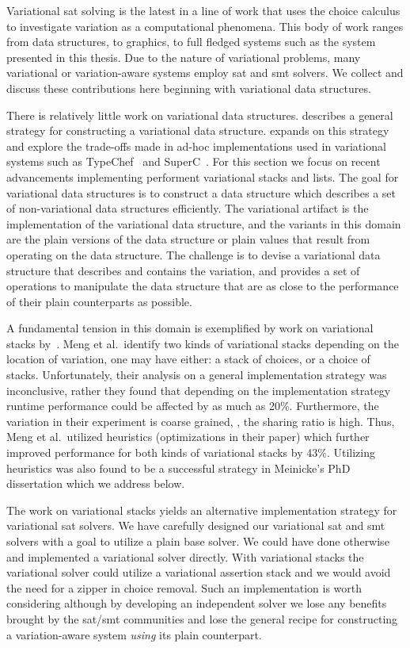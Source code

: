\label{section:related-work:variational-systems}
%
Variational \ac{sat} solving is the latest in a line of work that uses the
choice calculus to investigate variation as a computational phenomena. This body
of work ranges from data structures, to graphics, to full fledged systems such
as the system presented in this thesis. Due to the nature of variational
problems, many variational or variation-aware systems employ \ac{sat} and
\ac{smt} solvers. We collect and discuss these contributions here beginning with
variational data structures.

There is relatively little work on variational data structures.
\citet{EWC13fosd} describes a general strategy for constructing a variational
data structure. \citet{Walk14onward} expands on this strategy and explore the
trade-offs made in ad-hoc implementations used in variational systems such as
TypeChef~\cite{KKHL:FOSD10} and SuperC~\cite{GG:PLDI12}. For this section we
focus on recent advancements implementing performent variational stacks and
lists. The goal for variational data structures is to construct a data structure
which describes a set of non-variational data structures efficiently. The
variational artifact is the implementation of the variational data structure,
and the variants in this domain are the plain versions of the data structure or
plain values that result from operating on the data structure. The challenge is
to devise a variational data structure that describes and contains the
variation, and provides a set of operations to manipulate the data structure
that are as close to the performance of their plain counterparts as possible.

A fundamental tension in this domain is exemplified by work on variational
stacks by~\citet{MMWWK17vamos}. Meng et al.\ identify two kinds of variational
stacks depending on the location of variation, one may have either: a stack of
choices, or a choice of stacks. Unfortunately, their analysis on a general
implementation strategy was inconclusive, rather they found that depending on
the implementation strategy runtime performance could be affected by as much as
20\%. Furthermore, the variation in their experiment is coarse grained, \ie{},
the sharing ratio is high. Thus, Meng et al.\ utilized heuristics (optimizations
in their paper) which further improved performance for both kinds of variational
stacks by 43\%. Utilizing heuristics was also found to be a successful strategy
in Meinicke's PhD dissertation which we address below.

The work on variational stacks yields an alternative implementation strategy for
variational \ac{sat} solvers. We have carefully designed our variational
\ac{sat} and \ac{smt} solvers with a goal to utilize a plain base solver. We
could have done otherwise and implemented a variational solver directly. With
variational stacks the variational solver could utilize a variational assertion
stack and we would avoid the need for a zipper in choice removal. Such an
implementation is worth considering although by developing an independent solver
we lose any benefits brought by the \ac{sat}/\ac{smt} communities and lose the
general recipe for constructing a variation-aware system \emph{using} its plain
counterpart.

